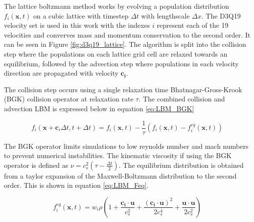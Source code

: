 The lattice boltzmann method works by evolving a population distribution $f_{i}(\mathbf{x}, t)$ on a cubic lattice with 
timestep $\Delta t$ with lengthscale $\Delta x$. \cite{qian_lattice_1992, succi_lattice_2018, he_theory_1997} The D3Q19 
velocity set is used in this work with the indexes $i$ represent each of the 19 velocities and converves mass and momentum 
conservation to the second order. It can be seen in Figure \ref{fig:d3q19_lattice}. The algorithm is split into the 
collision step where the populations on each lattice grid cell are relaxed towards an equilibrium, followed by the 
advection step where populations in each velocity direction are propagated with velocity $\mathbf{c_i}$. 

The collision step occurs using a single relaxation time Bhatnagar-Gross-Krook (BGK) collision operator at relaxation 
rate $\tau$. \cite{bhatnagar_model_1954, qian_lattice_1992} The combined collision and advection LBM is expressed below 
in equation \ref{eq:LBM_BGK}

\begin{equation}
    f_{i}(\mathbf{x} + \mathbf{c}_{i}\Delta t, t + \Delta t) = f_{i}(\mathbf{x}, t) - \frac{1}{\tau}(f_{i}(\mathbf{x}, t) 
    - f_{i}^{eq}(\mathbf{x}, t))
    \label{eq:LBM_BGK}
\end{equation}

The BGK operator limits simulations to low reynolds number and mach numbers to prevent numerical instabilities. 
\cite{qian_lattice_1992} The kinematic viscosity if using the BGK operator is defined as 
$\nu = c_s^2(\tau - \frac{\Delta t}{2})$. The equilibrium distribution is obtained from a taylor expansion of the 
Maxwell-Boltzmann distribution to the second order. \cite{he_theory_1997, succi_lattice_2018} This is shown in equation 
\ref{eq:LBM_Feq}.

\begin{equation}
    f_{i}^{eq}(\mathbf{x}, t) = w_i\rho(1 + \frac{\mathbf{c_i} \cdot \mathbf{u}}{c_s^2} + \frac{(\mathbf{c_i} \cdot 
    \mathbf{u})^2}{2c_s^4} + \frac{\mathbf{u} \cdot \mathbf{u}}{2c_s^2})
    \label{eq:LBM_Feq}
\end{equation}

